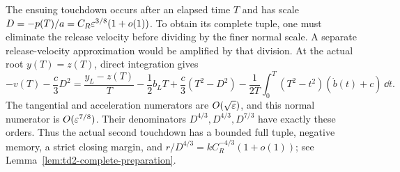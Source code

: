 The ensuing touchdown occurs after an elapsed time $T$ and has scale
$D=-p(T)/a=C_R\varepsilon^{3/8}(1+o(1))$. To obtain its complete tuple,
one must eliminate the release velocity before dividing by the finer
normal scale. A separate release-velocity approximation would be
amplified by that division. At the actual root $y(T)=z(T)$, direct integration gives
\begin{equation}
 -v(T)-\frac c3D^2
 =\frac{y_L-z(T)}T-\frac12b_LT+\frac c3(T^2-D^2)
 -\frac1{2T}\int_0^T(T^2-t^2)(\dot b(t)+c)\,\dd t.
 \label{loc:touchdown-cancellation}
\end{equation}
The tangential and acceleration numerators are $O(\sqrt{\varepsilon})$,
and this normal numerator is $O(\varepsilon^{7/8})$.
Their denominators $D^{4/3},D^{4/3},D^{7/3}$ have exactly these
orders. Thus the actual second touchdown has a bounded full tuple,
negative memory, a strict closing margin, and
$r/D^{4/3}=kC_R^{-4/3}(1+o(1))$; see
Lemma~\ref{lem:td2-complete-preparation}.


